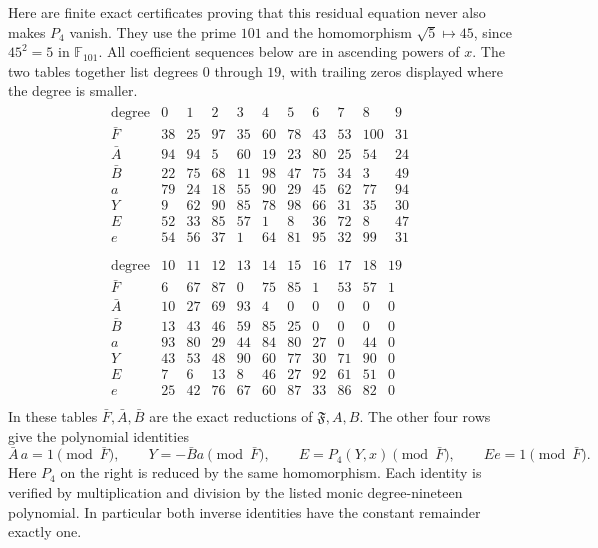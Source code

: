 Here are finite exact certificates proving that this residual equation
never also makes $P_4$ vanish. They use the prime $101$ and the
homomorphism $\sqrt5\mapsto45$, since $45^2=5$ in $\mathbb F_{101}$.
All coefficient sequences below are in ascending powers of $x$.
The two tables together list degrees $0$ through $19$, with trailing
zeros displayed where the degree is smaller.
\[
\begin{gathered}
\begin{array}{c|rrrrrrrrrr}
\text{degree}&0&1&2&3&4&5&6&7&8&9\\\hline
\bar F&38&25&97&35&60&78&43&53&100&31\\
\bar A&94&94&5&60&19&23&80&25&54&24\\
\bar B&22&75&68&11&98&47&75&34&3&49\\
a&79&24&18&55&90&29&45&62&77&94\\
Y&9&62&90&85&78&98&66&31&35&30\\
E&52&33&85&57&1&8&36&72&8&47\\
e&54&56&37&1&64&81&95&32&99&31\\
\end{array}
\\[1ex]
\begin{array}{c|rrrrrrrrrr}
\text{degree}&10&11&12&13&14&15&16&17&18&19\\\hline
\bar F&6&67&87&0&75&85&1&53&57&1\\
\bar A&10&27&69&93&4&0&0&0&0&0\\
\bar B&13&43&46&59&85&25&0&0&0&0\\
a&93&80&29&44&84&80&27&0&44&0\\
Y&43&53&48&90&60&77&30&71&90&0\\
E&7&6&13&8&46&27&92&61&51&0\\
e&25&42&76&67&60&87&33&86&82&0\\
\end{array}
\end{gathered}
\tag{ANP17}
\]
In these tables $\bar F,\bar A,\bar B$ are the exact reductions
of $\mathfrak F,A,B$. The other four rows give the polynomial
identities
\[
 \bar A\,a=1\pmod{\bar F},\qquad
 Y=-\bar B a\pmod{\bar F},\qquad
 E=P_4(Y,x)\pmod{\bar F},\qquad E e=1\pmod{\bar F}.
 \tag{ANP11}
\]
Here $P_4$ on the right is reduced by the same homomorphism.
Each identity is verified by multiplication and division by the
listed monic degree-nineteen polynomial. In particular both inverse
identities have the constant remainder exactly one.

